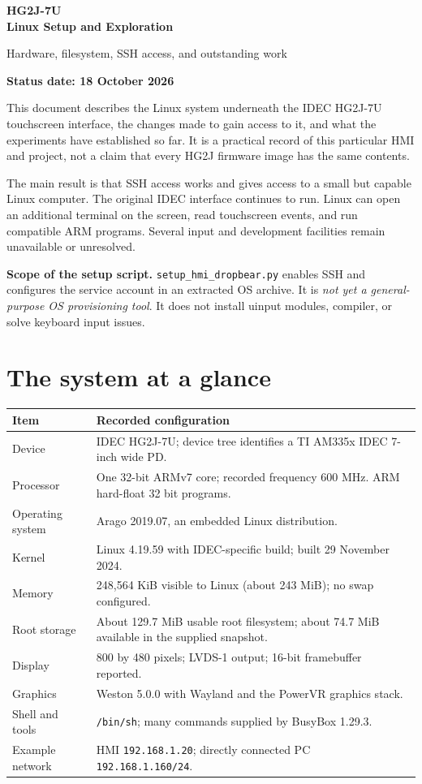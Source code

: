 \documentclass[10pt,letterpaper]{article}
\newcommand{\file}[1]{\nolinkurl{#1}}
\begin{document}
\thispagestyle{empty}
{\Huge\bfseries\color{accent} HG2J-7U\\[5pt] Linux Setup and Exploration}

{\large Hardware, filesystem, SSH access, and outstanding work}

\textbf{Status date: 18 October 2026}

This document describes the Linux system underneath the IDEC HG2J-7U touchscreen
interface, the changes made to gain access to it, and what the experiments have
established so far. It is a practical record of this particular HMI and project,
not a claim that every HG2J firmware image has the same contents.

The main result is that SSH access works and gives access to a small but capable
Linux computer. The original IDEC interface continues to run. Linux can open an
additional terminal on the screen, read touchscreen events, and run compatible
ARM programs. Several input and development facilities remain unavailable or
unresolved.

\textbf{Scope of the setup script.} \file{setup_hmi_dropbear.py} enables SSH and
configures the service account in an extracted OS archive.  It is \emph{not yet a general-purpose OS
provisioning tool}. It does not install uinput modules,  compiler, or solve
keyboard input issues. 

\section{The system at a glance}
\begin{tabularx}{\linewidth}{@{}p{1.45in}Y@{}}
\toprule
Item & Recorded configuration \\
\midrule
Device & IDEC HG2J-7U; device tree identifies a TI AM335x IDEC 7-inch wide PD. \\
Processor & One 32-bit ARMv7 core; recorded frequency 600 MHz. ARM hard-float 32 bit programs. \\
Operating system & Arago 2019.07, an embedded Linux distribution. \\
Kernel & Linux 4.19.59 with IDEC-specific build; built 29 November 2024. \\
Memory & 248,564 KiB visible to Linux (about 243 MiB); no swap configured. \\
Root storage & About 129.7 MiB usable root filesystem; about 74.7 MiB available in the supplied snapshot. \\
Display & 800 by 480 pixels; LVDS-1 output; 16-bit framebuffer reported. \\
Graphics & Weston 5.0.0 with Wayland and the PowerVR graphics stack. \\
Shell and tools & \file{/bin/sh}; many commands supplied by BusyBox 1.29.3. \\
Example network & HMI \file{192.168.1.20}; directly connected PC \file{192.168.1.160/24}. \\
\bottomrule
\end{tabularx}
\end{document}
